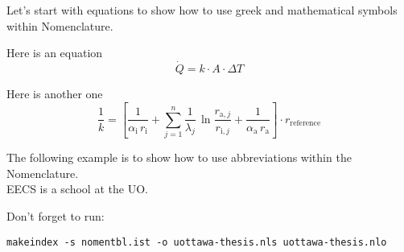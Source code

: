 \bigskip

\noindent
Let's start with equations to show how to use greek and mathematical symbols within Nomenclature.

Here is an equation
%
\begin{equation}\label{eq:heatflux}
  \dot{Q} = k \cdot A \cdot \Delta T
\end{equation}%
%
%
%
%
%
%
%

Here is another one
%
\begin{equation}\label{eq:ohtc}
  \frac{1}{k} = \left[\frac{1}{\alpha _{\mathrm{i}}\,r_{\mathrm{i}}} +
    \sum^n_{j=1}\frac{1}{\lambda _j}\,
    \ln \frac{r_{\mathrm{a},j}}{r_{\mathrm{i},j}} +
    \frac{1}{\alpha _{\mathrm{a}}\,
      r_{\mathrm{a}}}\right] \cdot r_{\mathrm{reference}}
\end{equation}%
%
%
%
%
%
%
% 
%


\bigskip

\noindent
The following example is to show how to use abbreviations within the Nomenclature.\\
EECS is a school at the UO.
%
%



\bigskip

\noindent
Don't forget to run:
\begin{verbatim}
makeindex -s nomentbl.ist -o uottawa-thesis.nls uottawa-thesis.nlo
\end{verbatim}



